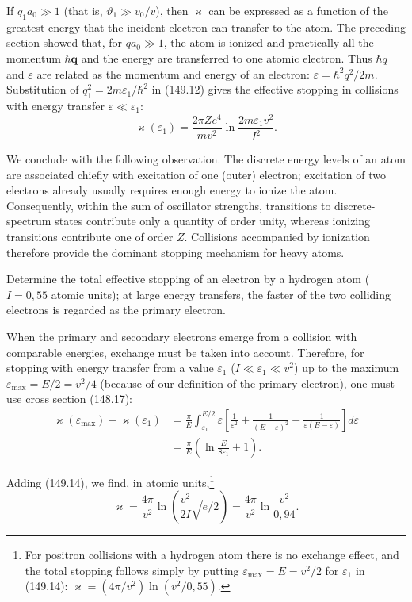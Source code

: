 If $q_1a_0\gg1$ (that is, $\vartheta_1\gg v_0/v$), then $\varkappa$ can be expressed as a function of the greatest energy that the incident electron can transfer to the atom. The preceding section showed that, for $qa_0\gg1$, the atom is ionized and practically all the momentum $\hbar\mathbf q$ and the energy are transferred to one atomic electron. Thus $\hbar q$ and $\varepsilon$ are related as the momentum and energy of an electron: $\varepsilon=\hbar^2q^2/2m$. Substitution of $q_1^2=2m\varepsilon_1/\hbar^2$ in (149.12) gives the effective stopping in collisions with energy transfer $\varepsilon\ll\varepsilon_1$:
\begin{equation}
 \varkappa(\varepsilon_1)=\frac{2\pi Ze^4}{mv^2}\ln\frac{2m\varepsilon_1v^2}{I^2}.
 \tag{149.14}
\end{equation}

We conclude with the following observation. The discrete energy levels of an atom are associated chiefly with excitation of one (outer) electron; excitation of two electrons already usually requires enough energy to ionize the atom. Consequently, within the sum of oscillator strengths, transitions to discrete-spectrum states contribute only a quantity of order unity, whereas ionizing transitions contribute one of order $Z$. Collisions accompanied by ionization therefore provide the dominant stopping mechanism for heavy atoms.

\ProblemHeading

\noindent Determine the total effective stopping of an electron by a hydrogen atom ($I=0{,}55$ atomic units); at large energy transfers, the faster of the two colliding electrons is regarded as the primary electron.

\SolutionHeading When the primary and secondary electrons emerge from a collision with comparable energies, exchange must be taken into account. Therefore, for stopping with energy transfer from a value $\varepsilon_1$ ($I\ll\varepsilon_1\ll v^2$) up to the maximum $\varepsilon_{\max}=E/2=v^2/4$ (because of our definition of the primary electron), one must use cross section (148.17):
\[
\begin{split}
 \varkappa(\varepsilon_{\max})-\varkappa(\varepsilon_1)
 &=\frac\pi E\int_{\varepsilon_1}^{E/2}\varepsilon
 \left[\frac1{\varepsilon^2}+\frac1{(E-\varepsilon)^2}
 -\frac1{\varepsilon(E-\varepsilon)}\right]d\varepsilon\\
 &=\frac\pi E\left(\ln\frac{E}{8\varepsilon_1}+1\right).
\end{split}
\]

Adding (149.14), we find, in atomic units,\footnote{For positron collisions with a hydrogen atom there is no exchange effect, and the total stopping follows simply by putting $\varepsilon_{\max}=E=v^2/2$ for $\varepsilon_1$ in (149.14): $\varkappa=(4\pi/v^2)\ln(v^2/0{,}55)$.}
\[
 \varkappa=\frac{4\pi}{v^2}\ln\left(\frac{v^2}{2I}\sqrt{e/2}\right)
 =\frac{4\pi}{v^2}\ln\frac{v^2}{0{,}94}.
\]
